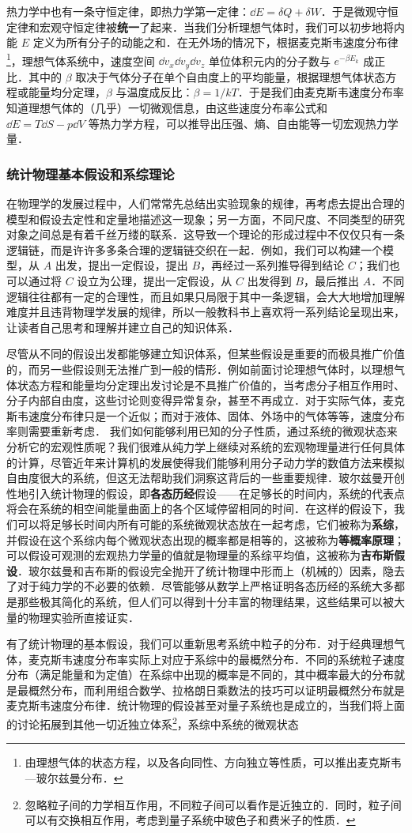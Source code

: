 热力学中也有一条守恒定律，即热力学第一定律：$\dd E=\delta Q+\delta W$．于是微观守恒定律和宏观守恒定律被\textbf{统一}了起来．当我们分析理想气体时，我们可以初步地将内能 $E$ 定义为所有分子的动能之和．在无外场的情况下，根据麦克斯韦速度分布律\footnote{由理想气体的状态方程，以及各向同性、方向独立等性质，可以推出麦克斯韦—玻尔兹曼分布．}，理想气体系统中，速度空间 $\dd v_x\dd v_y\dd v_z$ 单位体积元内的分子数与 $e^{-\beta E_k}$ 成正比．其中的 $\beta$ 取决于气体分子在单个自由度上的平均能量，根据理想气体状态方程或能量均分定理，$\beta$ 与温度成反比：$\beta=1/kT$．于是我们由麦克斯韦速度分布率知道理想气体的（几乎）一切微观信息，由这些速度分布率公式和 $\dd E=T\dd S-p\dd V$ 等热力学方程，可以推导出压强、熵、自由能等一切宏观热力学量．
\subsubsection{统计物理基本假设和系综理论}
在物理学的发展过程中，人们常常先总结出实验现象的规律，再考虑去提出合理的模型和假设去定性和定量地描述这一现象；另一方面，不同尺度、不同类型的研究对象之间总是有着千丝万缕的联系．这导致一个理论的形成过程中不仅仅只有一条逻辑链，而是许许多多条合理的逻辑链交织在一起．例如，我们可以构建一个模型，从 $A$ 出发，提出一定假设，提出 $B$，再经过一系列推导得到结论 $C$；我们也可以通过将 $C$ 设立为公理，提出一定假设，从 $C$ 出发得到 $B$，最后推出 $A$．不同逻辑往往都有一定的合理性，而且如果只局限于其中一条逻辑，会大大地增加理解难度并且违背物理学发展的规律，所以一般教科书上喜欢将一系列结论呈现出来，让读者自己思考和理解并建立自己的知识体系．

尽管从不同的假设出发都能够建立知识体系，但某些假设是重要的而极具推广价值的，而另一些假设则无法推广到一般的情形．例如前面讨论理想气体时，以理想气体状态方程和能量均分定理出发讨论是不具推广价值的，当考虑分子相互作用时、分子内部自由度，这些讨论则变得异常复杂，甚至不再成立．对于实际气体，麦克斯韦速度分布律只是一个近似；而对于液体、固体、外场中的气体等等，速度分布率则需要重新考虑． 我们如何能够利用已知的分子性质，通过系统的微观状态来分析它的宏观性质呢？我们很难从纯力学上继续对系统的宏观物理量进行任何具体的计算，尽管近年来计算机的发展使得我们能够利用分子动力学的数值方法来模拟自由度很大的系统，但这无法帮助我们洞察这背后的一些重要规律．玻尔兹曼开创性地引入统计物理的假设，即\textbf{各态历经}假设——在足够长的时间内，系统的代表点将会在系统的相空间能量曲面上的各个区域停留相同的时间．在这样的假设下，我们可以将足够长时间内所有可能的系统微观状态放在一起考虑，它们被称为\textbf{系综}，并假设在这个系综内每个微观状态出现的概率都是相等的，这被称为\textbf{等概率原理}；可以假设可观测的宏观热力学量的值就是物理量的系综平均值，这被称为\textbf{吉布斯假设}．玻尔兹曼和吉布斯的假设完全抛开了统计物理中形而上（机械的）因素，隐去了对于纯力学的不必要的依赖．尽管能够从数学上严格证明各态历经的系统大多都是那些极其简化的系统，但人们可以得到十分丰富的物理结果，这些结果可以被大量的物理实验所直接证实．

有了统计物理的基本假设，我们可以重新思考系统中粒子的分布．对于经典理想气体，麦克斯韦速度分布率实际上对应于系综中的最概然分布．不同的系统粒子速度分布（满足能量和为定值）在系综中出现的概率是不同的，其中概率最大的分布就是最概然分布，而利用组合数学、拉格朗日乘数法的技巧可以证明最概然分布就是麦克斯韦速度分布律．统计物理的假设甚至对量子系统也是成立的，当我们将上面的讨论拓展到其他一切近独立体系\footnote{忽略粒子间的力学相互作用，不同粒子间可以看作是近独立的．同时，粒子间可以有交换相互作用，考虑到量子系统中玻色子和费米子的性质．}，系综中系统的微观状态